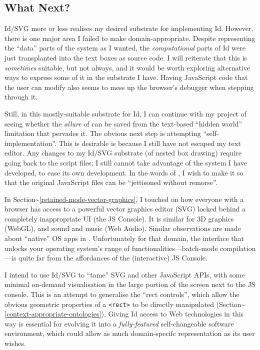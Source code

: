 \hypertarget{what-next}{%
\subsection{What Next?}\label{what-next}}

Id{}/SVG more or less realises my desired substrate for implementing
Id{}. However, there is one major area I failed to make
domain-appropriate. Despite representing the ``data'' parts of the
system as I wanted, the \emph{computational} parts of Id{} were just
transplanted into the text boxes as source code. I will reiterate that
this is \emph{sometimes} suitable, but not always, and it would be worth
exploring alternative ways to express some of it in the substrate I
have. Having JavaScript code that the user can modify also seems to mess
up the browser's debugger when stepping through it.

Still, in this mostly-suitable substrate for Id{}, I can continue with
my project of seeing whether the \emph{allure} of \cite{COLAs} can be
saved from the text-based ``hidden world'' limitation that pervades it.
The obvious next step is attempting ``self-implementation''. This is
desirable is because I still have not escaped my text editor. Any
changes to my Id{}/SVG substrate (of nested box drawing) require going
back to the script files; I still cannot take advantage of the system I
have developed, to ease its own development. In the words of
\cite{COLAs}, I wish to make it so that the original JavaScript files
can be ``jettisoned without remorse''.

In Section\textasciitilde{}\ref{retained-mode-vector-graphics}, I
touched on how everyone with a browser has access to a powerful vector
graphics editor (SVG) locked behind a completely inappropriate UI (the
JS Console). It is similar for 3D graphics (WebGL), and sound and music
(Web Audio). Similar observations are made about ``native'' OS apps in
\cite{prog21-dyn}. Unfortunately for that domain, the interface that
unlocks your operating system's range of functionalities---batch-mode
compilation---is quite far from the affordances of the (interactive) JS
Console.

I intend to use Id{}/SVG to ``tame'' SVG and other JavaScript APIs, with
some minimal on-demand visualisation in the large portion of the screen
next to the JS console. This is an attempt to generalise the ``rect
controls'', which allow the obvious geometric properties of a
\texttt{\textless{}rect\textgreater{}} to be directly manipulated
(Section\textasciitilde{}\ref{context-appropriate-ontologies}). Giving
Id{} access to Web technologies in this way is essential for evolving it
into a \emph{fully-featured} self-changeable software environment, which
could allow as much domain-specifc representation as its user wishes.
